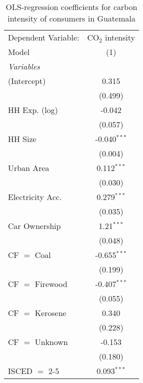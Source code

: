 
\begin{table}[htbp!]
   \centering
   \small
   \begin{adjustbox}{width = 1\textwidth, max height = 0.95\textheight, center}
      \begin{threeparttable}[b]
         \caption{\label{tab:OLS_1_GTM} OLS-regression coefficients for carbon intensity of consumers in Guatemala}
         \begin{tabular}{lc}
            \tabularnewline \midrule \midrule
            Dependent Variable: & CO$_{2}$ intensity\\  
            Model               & (1)\\  
            \midrule
            \emph{Variables}\\
            (Intercept)         & 0.315\\   
                                & (0.499)\\   
            HH Exp. (log)       & -0.042\\   
                                & (0.057)\\   
            HH Size             & -0.040$^{***}$\\   
                                & (0.004)\\   
            Urban Area          & 0.112$^{***}$\\   
                                & (0.030)\\   
            Electricity Acc.    & 0.279$^{***}$\\   
                                & (0.035)\\   
            Car Ownership       & 1.21$^{***}$\\   
                                & (0.048)\\   
            CF $=$ Coal         & -0.655$^{***}$\\   
                                & (0.199)\\   
            CF $=$ Firewood     & -0.407$^{***}$\\   
                                & (0.055)\\   
            CF $=$ Kerosene     & 0.340\\   
                                & (0.228)\\   
            CF $=$ Unknown      & -0.153\\   
                                & (0.180)\\   
            ISCED $=$ 2-5       & 0.093$^{***}$\\   

\end{tabular}
\end{threeparttable}
\end{adjustbox}
\end{table}
